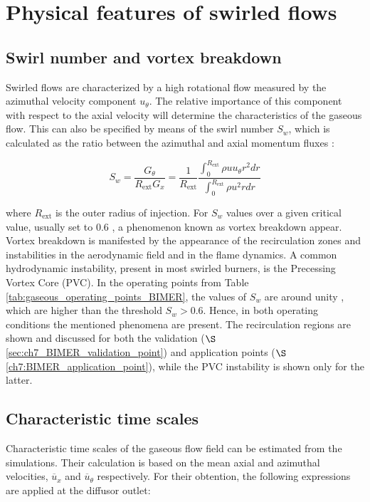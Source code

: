 \section{Physical features of swirled flows}

\subsection{Swirl number and vortex breakdown}
\label{subsec:BIMER_ch7_sw_vortex_breakdown}

Swirled flows are characterized by a high rotational flow measured by the azimuthal velocity component $u_\theta$. The relative importance of this component with respect to the axial velocity will determine the characteristics of the gaseous flow. This can also be specified by means of the swirl number $S_w$, which is calculated as the ratio between the azimuthal and axial momentum fluxes :

\begin{equation}
S_w = \frac{G_\theta}{R_\mathrm{ext} G_x} = \frac{1}{R_\mathrm{ext}} \frac{\int_0^{R_\mathrm{ext}} \rho u u_\theta r^2 dr}{\int_0^{R_\mathrm{ext}} \rho u^2 r dr}
\end{equation}

where $R_\mathrm{ext}$ is the outer radius of injection. For $S_w$ values over a given critical value, usually set to 0.6 , a phenomenon known as vortex breakdown appear. Vortex breakdown is manifested by the appearance of the recirculation zones and instabilities in the aerodynamic field and in the flame dynamics. A common hydrodynamic instability, present in most swirled burners, is the Precessing Vortex Core (PVC). In the operating points from Table \ref{tab:gaseous_operating_points_BIMER}, the values of $S_w$ are around unity , which are higher than the threshold $S_w > 0.6$. Hence, in both operating conditions the mentioned phenomena are present. The recirculation regions are shown and discussed for both the validation ($\S$\ref{sec:ch7_BIMER_validation_point}) and application points ($\S$\ref{ch7:BIMER_application_point}), while the PVC instability is shown only for the latter.

\subsection{Characteristic time scales}

Characteristic time scales of the gaseous flow field can be estimated from the simulations. Their calculation is based on the mean axial and azimuthal velocities, $\overline{u}_x$ and $\overline{u}_\theta$ respectively. For their obtention, the following expressions are applied at the diffusor outlet:

